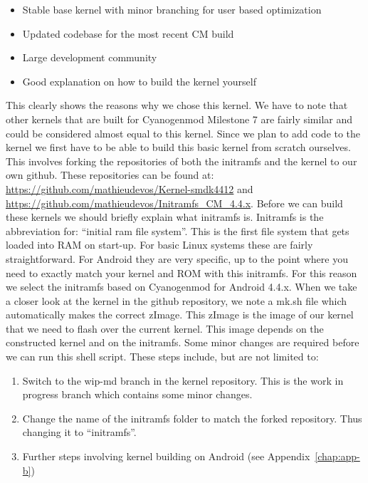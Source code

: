 \begin{itemize}
	\item Stable base kernel with minor branching for user based optimization
	\item Updated codebase for the most recent CM build
	\item Large development community
	\item Good explanation on how to build the kernel yourself
\end{itemize}

This clearly shows the reasons why we chose this kernel. We have to note that other kernels that are built for Cyanogenmod Milestone 7 are fairly similar and could be considered almost equal to this kernel. Since we plan to add code to the kernel we first have to be able to build this basic kernel from scratch ourselves. This involves forking the repositories of both the initramfs and the kernel to our own github. These repositories can be found at: \url{https://github.com/mathieudevos/Kernel-smdk4412} and \url{https://github.com/mathieudevos/Initramfs_CM_4.4.x}. 
\npar
Before we can build these kernels we should briefly explain what initramfs is. Initramfs is the abbreviation for: ``initial ram file system''. This is the first file system that gets loaded into RAM on start-up. For basic Linux systems these are fairly straightforward. For Android they are very specific, up to the point where you need to exactly match your kernel and ROM with this initramfs. For this reason we select the initramfs based on Cyanogenmod for Android 4.4.x. When we take a closer look at the kernel in the github repository, we note a mk.sh file which automatically makes the correct zImage. This zImage is the image of our kernel that we need to flash over the current kernel. This image depends on the constructed kernel and on the initramfs. Some minor changes are required before we can run this shell script. These steps include, but are not limited to:

\begin{enumerate}
	\item Switch to the wip-md branch in the kernel repository. This is the work in progress branch which contains some minor changes.
	\item Change the name of the initramfs folder to match the forked repository. Thus changing it to ``initramfs''. 
	\item Further steps involving kernel building on Android (see Appendix~\ref{chap:app-b})
\end{enumerate}

